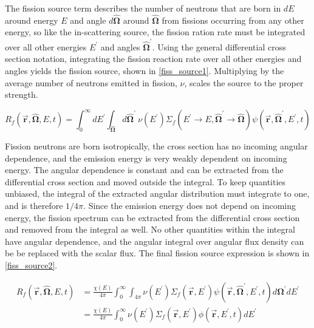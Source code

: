 The fission source term describes the number of neutrons that are born in $dE$ around energy $E$ and angle $d\boldsymbol{\hat{\Omega}}$ around $\boldsymbol{\hat{\Omega}}$ from fissions occurring from any other energy, so like the in-scattering source, the fission ration rate must be integrated over all other energies $E^\prime$ and angles $\boldsymbol{\hat{\Omega}}^\prime$.  Using the general differential cross section notation, integrating the fission reaction rate over all other energies and angles yields the fission source, shown in \eqref{fiss_source1}. Multiplying by the average number of neutrons emitted in fission, $\nu$, scales the source to the proper strength.  

\begin{equation}
\label{fiss_source1}
R_f(\boldsymbol{\vec{r}},\boldsymbol{\hat{\Omega}},E,t) =  \int_0^\infty dE^\prime \int_{\boldsymbol{\hat{\Omega}}} d\boldsymbol{\hat{\Omega}}^\prime \: \nu(E^\prime) \Sigma_f(E^\prime \rightarrow E,\boldsymbol{\hat{\Omega}}^\prime \rightarrow \boldsymbol{\hat{\Omega}}) \psi(\boldsymbol{\vec{r}},\boldsymbol{\hat{\Omega}}^\prime,E^\prime,t)  
 \end{equation}
 
 Fission neutrons are born isotropically, the cross section has no incoming angular dependence, and the emission energy is very weakly dependent on incoming energy.  The angular dependence is constant and can be extracted from the differential cross section and moved outside the integral.  To keep quantities unbiased, the integral of the extracted angular distribution must integrate to one, and is therefore $1/4\pi$.  Since the emission energy does not depend on incoming energy, the fission spectrum can be extracted from the differential cross section and removed from the integral as well.  No other quantities within the integral have angular dependence, and the angular integral over angular flux density can be be replaced with the scalar flux.  The final fission source expression is shown in \eqref{fiss_source2}.

\begin{equation}
\label{fiss_source2}
\begin{split}
R_f(\boldsymbol{\vec{r}},\boldsymbol{\hat{\Omega}},E,t) & = \frac{\chi(E)}{4\pi} \int_0^\infty  \int_{4\pi}   \nu(E^\prime) \Sigma_f(\boldsymbol{\vec{r}},E^\prime) \psi(\boldsymbol{\vec{r}},\boldsymbol{\hat{\Omega}}^\prime,E^\prime,t) d\boldsymbol{\Omega}^\prime  dE^\prime \\
&= \frac{\chi(E)}{4\pi} \int_0^\infty   \nu(E^\prime) \Sigma_f(\boldsymbol{\vec{r}},E^\prime) \phi(\boldsymbol{\vec{r}},E^\prime,t)  dE^\prime
\end{split}
 \end{equation}


